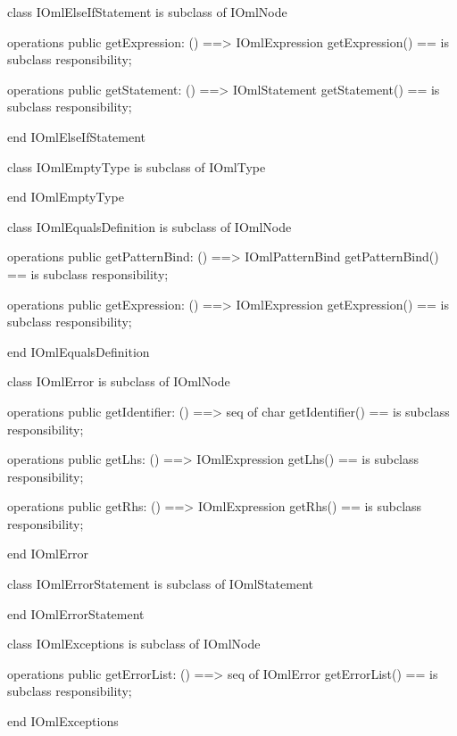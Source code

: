 \begin{vdm_al}
class IOmlElseIfStatement
 is subclass of IOmlNode

operations
  public getExpression: () ==> IOmlExpression
  getExpression() == is subclass responsibility;

operations
  public getStatement: () ==> IOmlStatement
  getStatement() == is subclass responsibility;

end IOmlElseIfStatement
\end{vdm_al}

\begin{vdm_al}
class IOmlEmptyType
 is subclass of IOmlType

end IOmlEmptyType
\end{vdm_al}

\begin{vdm_al}
class IOmlEqualsDefinition
 is subclass of IOmlNode

operations
  public getPatternBind: () ==> IOmlPatternBind
  getPatternBind() == is subclass responsibility;

operations
  public getExpression: () ==> IOmlExpression
  getExpression() == is subclass responsibility;

end IOmlEqualsDefinition
\end{vdm_al}

\begin{vdm_al}
class IOmlError
 is subclass of IOmlNode

operations
  public getIdentifier: () ==> seq of char
  getIdentifier() == is subclass responsibility;

operations
  public getLhs: () ==> IOmlExpression
  getLhs() == is subclass responsibility;

operations
  public getRhs: () ==> IOmlExpression
  getRhs() == is subclass responsibility;

end IOmlError
\end{vdm_al}

\begin{vdm_al}
class IOmlErrorStatement
 is subclass of IOmlStatement

end IOmlErrorStatement
\end{vdm_al}

\begin{vdm_al}
class IOmlExceptions
 is subclass of IOmlNode

operations
  public getErrorList: () ==> seq of IOmlError
  getErrorList() == is subclass responsibility;

end IOmlExceptions
\end{vdm_al}


